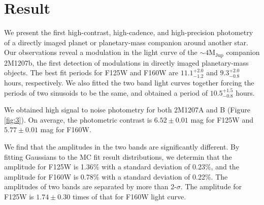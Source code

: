 \documentclass[apj]{emulateapj}
\newcommand{\period}{$10.5^{+1.5}_{-0.8}$}
\begin{document}
\section{Result}



We present the first high-contrast, high-cadence, and high-precision
photometry of a directly imaged planet or planetary-mass
companion around another star. Our observations reveal a modulation in the light curve of
the $\sim 4 \mathrm{M_{{Jup}}}$ companion 2M1207b, the first detection
of modulations in directly imaged planetary-mass objects. The best
fit periods for F125W and F160W are $11.1_{-1.2}^{+2.0}$ and $9.3_{-0.8}^{+2.0}$ hours,
respectively. We also fitted the two band light curves together forcing the
periods of two sinusoids to be the same, and obtained a period
of \period{} hours. 

We obtained high signal to noise photometry for both 2M1207A
and B (Figure \ref{fig:3}). On average, the photometric contrast is
$6.52\pm0.01$ mag for F125W and $5.77\pm0.01$ mag for F160W.



We find that the amplitudes in the two bands are
significantly different. By fitting Gaussians to the MC fit result
distributions, we determin that the  amplitude for F125W is
1.36\% with a standard deviation of 0.23\%, and  the amplitude for F160W is
0.78\% with a standard deviation of 0.22\%. The amplitudes of two
bands are separated by more than 2-$\sigma$. The amplitude
for F125W is $1.74\pm0.30$ times of that for F160W light curve.
\end{document}
